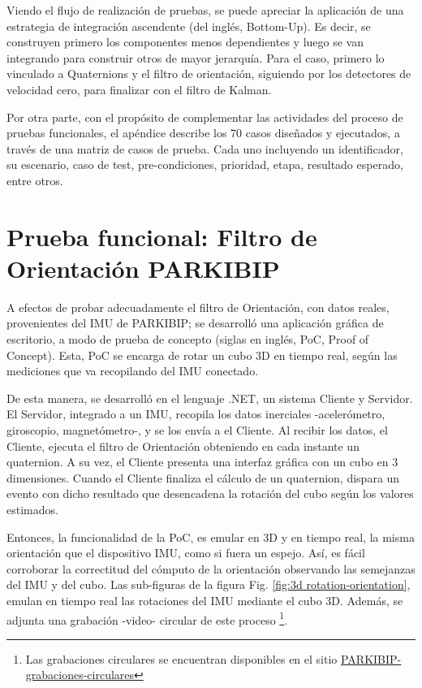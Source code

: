 \noindent Viendo el flujo de realización de pruebas, se puede apreciar la aplicación de una estrategia  de integración ascendente (del inglés, Bottom-Up). Es decir, se construyen primero los componentes menos dependientes y luego se van integrando para construir otros de mayor jerarquía. Para el caso, primero lo vinculado a Quaternions y  el filtro de orientación, siguiendo por los detectores de velocidad cero, para finalizar con el filtro de Kalman.

Por otra parte, con el propósito de complementar las actividades del proceso de pruebas funcionales, el apéndice  describe los 70 casos diseñados y ejecutados, a través de una matriz de casos de prueba. Cada uno incluyendo un identificador, su escenario, caso de test, pre-condiciones, prioridad, etapa, resultado esperado, entre otros.  


\section{Prueba funcional: Filtro de Orientación PARKIBIP}

A efectos de probar adecuadamente el filtro de Orientación, con datos reales, provenientes del IMU de PARKIBIP; se desarrolló una aplicación gráfica de escritorio, a modo de prueba de concepto (siglas en inglés, PoC, Proof of Concept). Esta, PoC se encarga de rotar un cubo 3D en tiempo real, según las mediciones que va recopilando del IMU conectado.

De esta manera, se desarrolló en el lenguaje \gls{.NET}, un sistema Cliente y Servidor. El Servidor, integrado a un IMU, recopila los datos inerciales -acelerómetro, giroscopio, magnetómetro-, y se los envía a el Cliente. Al recibir los datos, el Cliente, ejecuta el filtro de Orientación obteniendo en cada instante un quaternion. A su vez, el Cliente presenta una interfaz gráfica con un cubo en 3 dimensiones. Cuando el Cliente finaliza el cálculo de un quaternion, dispara un evento con dicho resultado que desencadena la rotación del cubo según los valores estimados. 

Entonces, la funcionalidad de la PoC, es emular en 3D y en tiempo real, la misma orientación que el dispositivo IMU, como si fuera un espejo. Así, es fácil corroborar la correctitud del cómputo de la orientación observando las semejanzas del IMU y del cubo. Las sub-figuras de la figura Fig. \ref{fig:3d rotation-orientation}, emulan en tiempo real las rotaciones del IMU mediante el cubo 3D. Además, se adjunta una grabación -video- circular de este proceso \footnote{Las grabaciones circulares se encuentran disponibles en el sitio  \href{https://drive.google.com/drive/folders/1qmg-Nex1i13uaCr66KOUZ3LE5vgFuK2W?usp=sharing}{PARKIBIP-grabaciones-circulares}
}.

